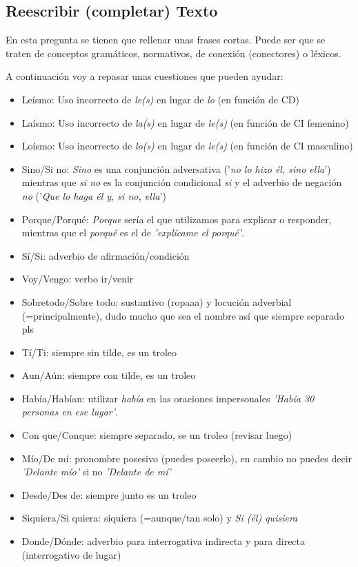\documentclass[arial,a4paper,print]{article}
\begin{document}
\pagebreak

\subsection{Reescribir (completar) Texto}
En esta pregunta se tienen que rellenar unas frases cortas. Puede ser que se traten de conceptos gramáticos, normativos, de conexión (conectores) o léxicos. 

A continuación voy a repasar unas cuestiones que pueden ayudar:
\begin{itemize}
	
\item Leísmo: Uso incorrecto de \textit{le(s)} en lugar de \textit{lo} (en función de CD)
\item Laísmo: Uso incorrecto de \textit{la(s)} en lugar de \textit{le(s)} (en función de CI femenino)
\item Loísmo: Uso incorrecto de \textit{lo(s)} en lugar de \textit{le(s)} (en función de CI masculino)
\item Sino/Si no: \textit{Sino} es una conjunción adversativa ('\textit{no lo hizo él, sino ella}') mientras que \textit{si no} es la conjunción condicional \textit{si} y el adverbio de negación \textit{no} ('\textit{Que lo haga él y, si no, ella}')
\item Porque/Porqué: \textit{Porque} sería el que utilizamos para explicar o responder, mientras que el \textit{porqué} es el de \textit{'explícame el porqué'}. 
\item Sí/Si: adverbio de afirmación/condición 
\item Voy/Vengo: verbo ir/venir 
\item Sobretodo/Sobre todo: sustantivo (ropaaa) y locución adverbial (=principalmente), dudo mucho que sea el nombre así que siempre separado pls
\item Tí/Ti: siempre sin tilde, es un troleo
\item Aun/Aún: siempre con tilde, es un troleo
\item Había/Habían: utilizar \textit{había} en las oraciones impersonales \textit{'Había 30 personas en ese lugar'}. 
\item Con que/Conque: siempre separado, se un troleo (revisar luego)
\item Mío/De mí: pronombre posesivo (puedes poseerlo), en cambio no puedes decir \textit{'Delante mío'} si no \textit{'Delante de mí'}
\item Desde/Des de: siempre junto es un troleo
\item Siquiera/Si quiera: siquiera (=aunque/tan solo) y \textit{Si (él) quisiera}
\item Donde/Dónde: adverbio para interrogativa indirecta y para directa (interrogativo de lugar)
	
\end{itemize}
\end{document}
